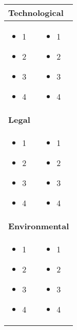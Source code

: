 \begin{tabular}{|p{7cm}|p{7cm}|}
  \\
  \hline
  \multicolumn{2}{|l|}{\textbf{Technological}} \\
  \hline
  \begin{itemize}[leftmargin=0.8em]
    \item 1
    \item 2
    \item 3
    \item 4
  \end{itemize}
  &
  \begin{itemize}[leftmargin=0.8em]
    \item 1
    \item 2
    \item 3
    \item 4
  \end{itemize}
  \\
  \hline
  \multicolumn{2}{|l|}{\textbf{Legal}} \\
  \hline
  \begin{itemize}[leftmargin=0.8em]
    \item 1
    \item 2
    \item 3
    \item 4
  \end{itemize}
  &
  \begin{itemize}[leftmargin=0.8em]
    \item 1
    \item 2
    \item 3
    \item 4
  \end{itemize}
  \\
  \hline
  \multicolumn{2}{|l|}{\textbf{Environmental}} \\
  \hline
  \begin{itemize}[leftmargin=0.8em]
    \item 1
    \item 2
    \item 3
    \item 4
  \end{itemize}
  &
  \begin{itemize}[leftmargin=0.8em]
    \item 1
    \item 2
    \item 3
    \item 4
  \end{itemize}
  \\
  \hline
\end{tabular}
